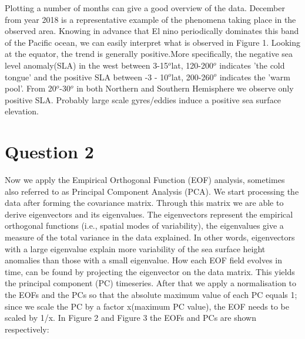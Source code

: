 \documentclass{article}
\begin{document}
Plotting a number of months can give a good overview of the data. December from year 2018 is a representative example of the phenomena taking place in the observed area. Knowing in advance that El nino periodically dominates this band of the Pacific ocean, we can easily interpret what is observed in Figure 1. Looking at the equator, the trend is generally positive.More specifically, the negative sea level anomaly(SLA) in the west between 3-15$^o$lat, 120-200$^o$ indicates 'the cold tongue' and the positive SLA between -3 - 10$^o$lat, 200-260$^o$ indicates the 'warm pool'. From 20$^o$-30$^o$ in both Northern and Southern Hemisphere we observe only positive SLA. Probably large scale gyres/eddies induce a positive sea surface elevation. 



\newpage
\section*{Question 2}
Now we apply the Empirical Orthogonal Function (EOF) analysis, sometimes also referred to as Principal Component Analysis (PCA). We start processing the data after forming the covariance matrix. Through this matrix we are able to derive eigenvectors and its eigenvalues. The eigenvectors represent the empirical orthogonal functions (i.e., spatial modes of variability), the eigenvalues give a measure of the total variance in the data explained. In other words, eigenvectors with a large eigenvalue explain more variability of the sea surface height anomalies than those with a small eigenvalue. How each EOF field evolves in time, can be found by projecting the eigenvector on the data matrix. This yields the principal component (PC) timeseries. After that we apply a normalisation to the EOFs and the PCs so that the absolute maximum value of each PC equals 1; since we scale the PC by a factor x(maximum PC value), the EOF needs to be scaled by 1/x. In Figure 2 and Figure 3 the EOFs and  PCs are shown respectively:
\end{document}
